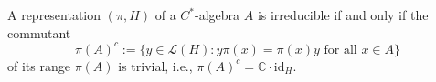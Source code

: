 A representation $(\pi, H)$ of a $C^*$-algebra $A$ is irreducible if and only if the commutant
$$
\pi(A)^c := \{ y \in \mathcal{L}(H) : y\pi(x) = \pi(x)y \text{ for all } x \in A \}
$$
of its range $\pi(A)$ is trivial, i.e., $\pi(A)^c = \mathbb{C} \cdot \mathrm{id}_H$.

